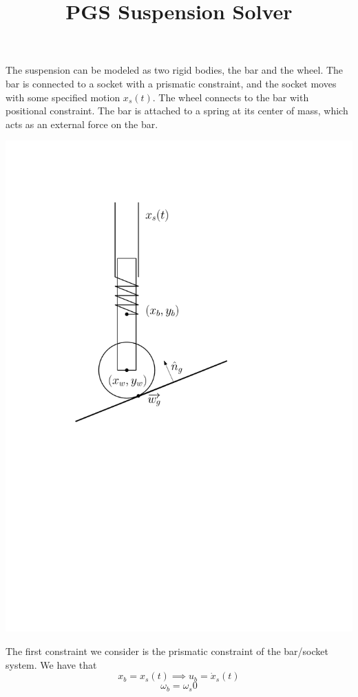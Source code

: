 \documentclass[9pt]{article}
\title{PGS Suspension Solver}
\begin{document}
\maketitle

The suspension can be modeled as two rigid bodies, the bar and the wheel. The bar is connected to a socket with a prismatic constraint, and the socket moves with some specified motion $x_s(t)$. The wheel connects to the bar with positional constraint. The bar is attached to a spring at its center of mass, which acts as an external force on the bar.

\begin{center}
\includegraphics[scale=0.5]{diagram.pdf}
\end{center}

The first constraint we consider is the prismatic constraint of the bar/socket system. We have that 
\[
x_b = x_s(t) \implies u_b = \dot{x}_s(t)
\]
\[
\omega_b = \omega_s 0
\]
\end{document}
